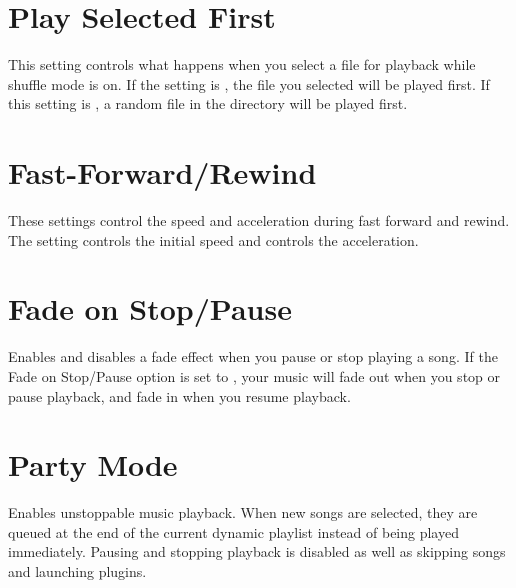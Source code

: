 \section{Play Selected First}
  This setting controls what happens when you
  select a file for playback while shuffle mode is on. If the
   setting is , the file you
  selected will be played first. If this setting is , a random
  file in the directory will be played first.

\section{Fast-Forward/Rewind}
  These settings control the speed and acceleration during fast forward and rewind.
  The setting  controls the initial speed and  controls the acceleration.


\section{Fade on Stop/Pause}
  Enables and disables a fade effect when you
  pause or stop playing a song. If the Fade on Stop/Pause option is
  set to , your music will fade out when you stop or pause 
  playback, and fade in when you resume playback.
    
\section{Party Mode}
  Enables unstoppable music playback. When new songs are
  selected, they are queued at the end of the current dynamic playlist
  instead of being played immediately. Pausing and stopping playback is
  disabled as well as skipping songs and launching plugins.

